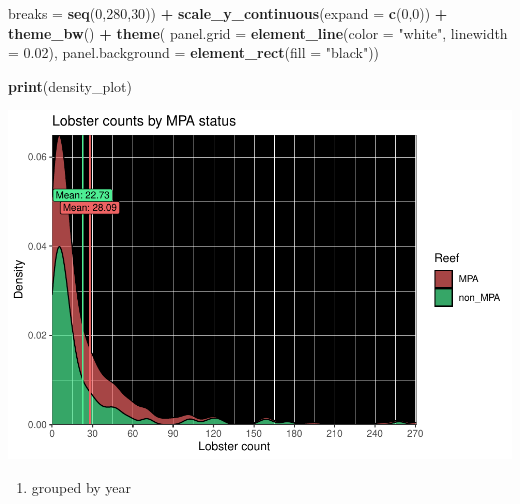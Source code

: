\documentclass[
]{article}
\newenvironment{Shaded}{\begin{snugshade}}{\end{snugshade}}
\newcommand{\AttributeTok}[1]{\textcolor[rgb]{0.13,0.29,0.53}{#1}}
\newcommand{\DecValTok}[1]{\textcolor[rgb]{0.00,0.00,0.81}{#1}}
\newcommand{\FloatTok}[1]{\textcolor[rgb]{0.00,0.00,0.81}{#1}}
\newcommand{\FunctionTok}[1]{\textcolor[rgb]{0.13,0.29,0.53}{\textbf{#1}}}
\newcommand{\NormalTok}[1]{#1}
\newcommand{\SpecialCharTok}[1]{\textcolor[rgb]{0.81,0.36,0.00}{\textbf{#1}}}
\newcommand{\StringTok}[1]{\textcolor[rgb]{0.31,0.60,0.02}{#1}}
\providecommand{\tightlist}{%
  \setlength{\itemsep}{0pt}\setlength{\parskip}{0pt}}
\begin{document}
\begin{Shaded}
\begin{Highlighting}[]
                     \AttributeTok{breaks =} \FunctionTok{seq}\NormalTok{(}\DecValTok{0}\NormalTok{,}\DecValTok{280}\NormalTok{,}\DecValTok{30}\NormalTok{)) }\SpecialCharTok{+}
  \FunctionTok{scale\_y\_continuous}\NormalTok{(}\AttributeTok{expand =} \FunctionTok{c}\NormalTok{(}\DecValTok{0}\NormalTok{,}\DecValTok{0}\NormalTok{)) }\SpecialCharTok{+}
  \FunctionTok{theme\_bw}\NormalTok{() }\SpecialCharTok{+}
  \FunctionTok{theme}\NormalTok{(}
        \AttributeTok{panel.grid =} \FunctionTok{element\_line}\NormalTok{(}\AttributeTok{color =} \StringTok{"white"}\NormalTok{,}
                                  \AttributeTok{linewidth =} \FloatTok{0.02}\NormalTok{),}
        \AttributeTok{panel.background =} \FunctionTok{element\_rect}\NormalTok{(}\AttributeTok{fill =} \StringTok{"black"}\NormalTok{)) }
  
 

  
\FunctionTok{print}\NormalTok{(density\_plot)}
\end{Highlighting}
\end{Shaded}

\includegraphics{hw1-lobstrs-eds241_files/figure-latex/unnamed-chunk-8-1.pdf}

\begin{enumerate}
\def\labelenumi{\arabic{enumi})}
\setcounter{enumi}{1}
\tightlist
\item
  grouped by year
\end{enumerate}
\end{document}
